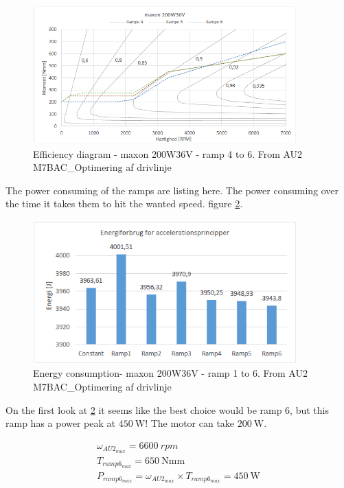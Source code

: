 \begin{figure}[H]
	\centering
	\includegraphics [width=4in]{Software/Pictures/Momentramper-4-6.PNG}
	\caption{Efficiency diagram - maxon 200W36V - ramp 4 to 6. From AU2 M7BAC\_Optimering af drivlinje}
	\label{fig:eff_maxon_36V_ramp4-6}
\end{figure}

The power consuming of the ramps are listing here. The power consuming over the time it takes them to hit the wanted speed. figure \ref{fig:eff_maxon_36V_ramp_energy-consumption}.

\begin{figure}[H]
	\centering
	\includegraphics [width=4in]{Software/Pictures/energy-consumption.PNG}
	\caption{Energy consumption- maxon 200W36V - ramp 1 to 6. From AU2 M7BAC\_Optimering af drivlinje}
	\label{fig:eff_maxon_36V_ramp_energy-consumption}
\end{figure}

On the first look at \ref{fig:eff_maxon_36V_ramp_energy-consumption} it seems like the best choice would be ramp 6, but  this ramp has a power peak at $ \SI{450}{\watt} $! The motor can take $ \SI{200}{\watt} $. 

\begin{equation}
	\begin{split}
		\omega_{AU2_{max}} = \SI{6600}{rpm}\\
		T_{ramp6_{max}} = \SI{650}{\newton \milli\metre} \\
		P_{ramp6_{max}} = \omega_{AU2_{max}} \times T_{ramp6_{max}} = \SI{450}{\watt}
	\end{split}
\end{equation}

